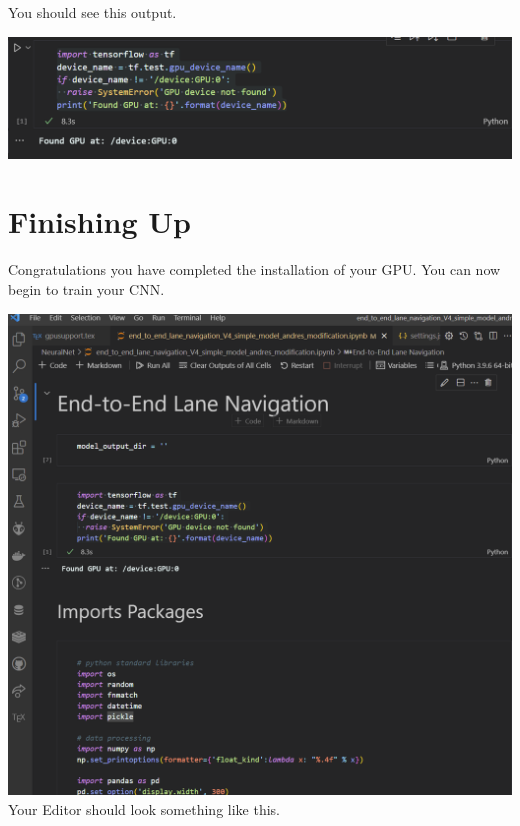 \documentclass[11pt]{report}
\begin{document}
You should see this output.
\begin{center}
\includegraphics[width=1\textwidth]{gputest.png}
\end{center}

\section{Finishing Up}
Congratulations you have completed the installation of your GPU. You can now begin to train your CNN.
\begin{center}
\includegraphics[width=1\textwidth]{final.png}
Your Editor should look something like this. 
\end{center}
\end{document}
